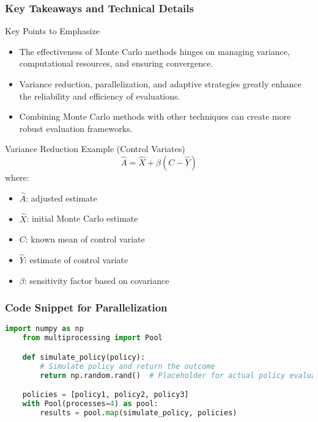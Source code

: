\documentclass[aspectratio=169]{beamer}
\begin{document}
\begin{frame}[fragile]
    \frametitle{Key Takeaways and Technical Details}
    \begin{block}{Key Points to Emphasize}
        \begin{itemize}
            \item The effectiveness of Monte Carlo methods hinges on managing variance, computational resources, and ensuring convergence.
            \item Variance reduction, parallelization, and adaptive strategies greatly enhance the reliability and efficiency of evaluations.
            \item Combining Monte Carlo methods with other techniques can create more robust evaluation frameworks.
        \end{itemize}
    \end{block}
    
    \begin{block}{Variance Reduction Example (Control Variates)}
        \begin{equation}
            \hat{A} = \hat{X} + \beta (C - \hat{Y})
        \end{equation}
        where:
        \begin{itemize}
            \item \( \hat{A} \): adjusted estimate
            \item \( \hat{X} \): initial Monte Carlo estimate
            \item \( C \): known mean of control variate
            \item \( \hat{Y} \): estimate of control variate
            \item \( \beta \): sensitivity factor based on covariance
        \end{itemize}
    \end{block}
\end{frame}

\begin{frame}[fragile]
    \frametitle{Code Snippet for Parallelization}
    \begin{lstlisting}[language=Python]
    import numpy as np
    from multiprocessing import Pool

    def simulate_policy(policy):
        # Simulate policy and return the outcome
        return np.random.rand()  # Placeholder for actual policy evaluation

    policies = [policy1, policy2, policy3]
    with Pool(processes=4) as pool:
        results = pool.map(simulate_policy, policies)
    \end{lstlisting}
\end{frame}
\end{document}
